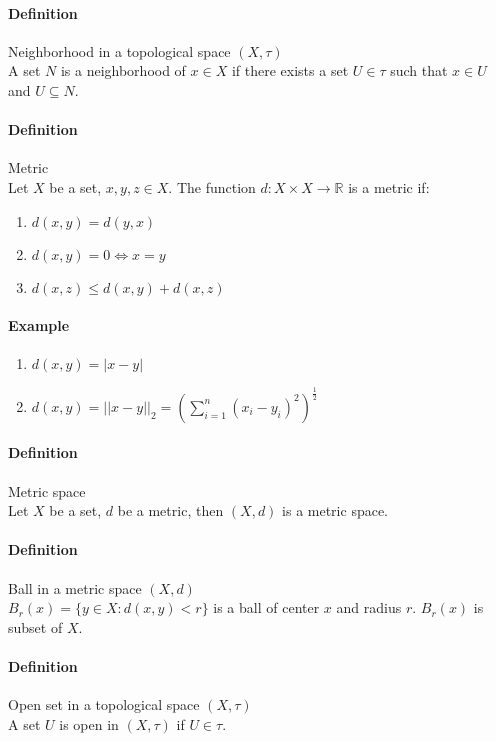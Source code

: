 \documentclass{article}
\newcommand{\abs}[1]{\left|#1\right|}
\newcommand{\R}{\mathbb{R}}
\newcommand{\Def}{\paragraph{Definition}}
\newcommand{\Example}{\paragraph{Example}}
\begin{document}
  \Def Neighborhood in a topological space $(X, \tau)$
\\A set $N$ is a neighborhood of $x \in X$ if there exists a set $U \in \tau$
  such that $x \in U$ and $U \subseteq N$.

  \Def Metric
\\Let $X$ be a set, $x, y, z \in X$. The function $d : X \times X \rightarrow
  \R$ is a metric if:
  \begin{enumerate}[label=(\roman*)]
    \item $d(x,y) = d(y,x)$
    \item $d(x,y) = 0 \iff x = y$
    \item $d(x,z) \leq d(x,y) + d(x,z)$
  \end{enumerate}

  \Example
  \begin{enumerate}[label=(\arabic*)]
    \item $d(x,y) = \abs{x - y}$
    \item $\displaystyle d(x,y) = ||x - y||_2 =
    \left(\sum_{i = 1}^n (x_i - y_i)^2\right)^{\frac{1}{2}}$
  \end{enumerate}

  \Def Metric space
\\Let $X$ be a set, $d$ be a metric, then $(X, d)$ is a metric space.

  \Def Ball in a metric space $(X, d)$
\\$B_r(x) = \{ y \in X : d(x,y) < r \}$ is a ball of center $x$ and radius $r$.
  $B_r(x)$ is subset of $X$.

  \Def Open set in a topological space $(X, \tau)$
\\A set $U$ is open in $(X, \tau)$ if $U \in \tau$.
\end{document}
